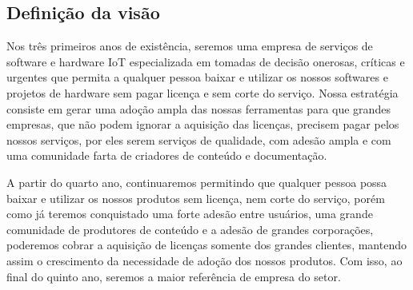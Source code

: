 \subsection{Definição da visão}

Nos três primeiros anos de existência, seremos uma empresa de serviços de 
software e hardware IoT especializada em tomadas de decisão onerosas, críticas 
e urgentes que permita a qualquer pessoa baixar e utilizar os nossos softwares 
e projetos de hardware sem pagar licença e sem corte do serviço. Nossa 
estratégia consiste em gerar uma adoção ampla das nossas ferramentas para que 
grandes empresas, que não podem ignorar a aquisição das licenças, precisem 
pagar pelos nossos serviços, por eles serem serviços de qualidade, com adesão 
ampla e com uma comunidade farta de criadores de conteúdo e documentação.

A partir do quarto ano, continuaremos permitindo que qualquer pessoa possa 
baixar e utilizar os nossos produtos sem licença, nem corte do serviço, porém 
como já teremos conquistado uma forte adesão entre usuários, uma grande 
comunidade de produtores de conteúdo e a adesão de grandes corporações, 
poderemos cobrar a aquisição de licenças somente dos grandes clientes, 
mantendo assim o crescimento da necessidade de adoção dos nossos produtos. 
Com isso, ao final do quinto ano, seremos a maior referência de empresa do 
setor.
